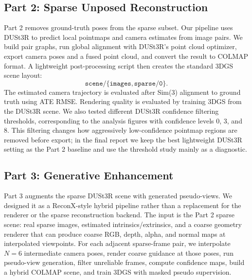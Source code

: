 \documentclass[10pt,twocolumn,letterpaper]{article}
\begin{document}
\subsection{Part 2: Sparse Unposed Reconstruction}

Part 2 removes ground-truth poses from the sparse subset.  Our pipeline uses DUSt3R to predict local pointmaps and camera estimates from image pairs.  We build pair graphs, run global alignment with DUSt3R's point cloud optimizer, export camera poses and a fused point cloud, and convert the result to COLMAP format.  A lightweight post-processing script then creates the standard 3DGS scene layout:
\[
\texttt{scene}/\{\texttt{images},\texttt{sparse/0}\}.
\]
The estimated camera trajectory is evaluated after Sim(3) alignment to ground truth using ATE RMSE.  Rendering quality is evaluated by training 3DGS from the DUSt3R scene.  We also tested different DUSt3R confidence filtering thresholds, corresponding to the analysis figures with confidence levels 0, 3, and 8.  This filtering changes how aggressively low-confidence pointmap regions are removed before export; in the final report we keep the best lightweight DUSt3R setting as the Part 2 baseline and use the threshold study mainly as a diagnostic.

\subsection{Part 3: Generative Enhancement}

Part 3 augments the sparse DUSt3R scene with generated pseudo-views.  We designed it as a ReconX-style hybrid pipeline rather than a replacement for the renderer or the sparse reconstruction backend.  The input is the Part 2 sparse scene: real sparse images, estimated intrinsics/extrinsics, and a coarse geometry renderer that can produce coarse RGB, depth, alpha, and normal maps at interpolated viewpoints.  For each adjacent sparse-frame pair, we interpolate $N=6$ intermediate camera poses, render coarse guidance at those poses, run pseudo-view generation, filter unreliable frames, compute confidence maps, build a hybrid COLMAP scene, and train 3DGS with masked pseudo supervision.
\end{document}
